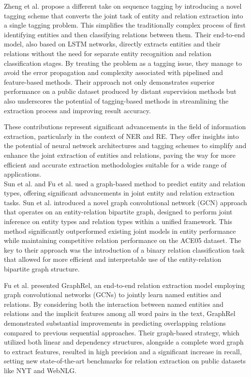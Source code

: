 Zheng et al. propose a different take on sequence tagging by introducing a novel tagging scheme that converts the joint task of entity and relation extraction into a single tagging problem. This simplifies the traditionally complex process of first identifying entities and then classifying relations between them. Their end-to-end model, also based on LSTM networks, directly extracts entities and their relations without the need for separate entity recognition and relation classification stages. By treating the problem as a tagging issue, they manage to avoid the error propagation and complexity associated with pipelined and feature-based methods. Their approach not only demonstrates superior performance on a public dataset produced by distant supervision methods but also underscores the potential of tagging-based methods in streamlining the extraction process and improving result accuracy.

These contributions represent significant advancements in the field of information extraction, particularly in the context of NER and RE. They offer insights into the potential of neural network architectures and tagging schemes to simplify and enhance the joint extraction of entities and relations, paving the way for more efficient and accurate extraction methodologies suitable for a wide range of applications.\\
Sun et al.\cite{sun-etal-2019-joint} and Fu et al.\cite{fu-etal-2019-graphrel} used a graph-based method to predict entity and relation types, offering significant advancements in joint entity and relation extraction tasks. Sun et al. introduced a novel graph convolutional network (GCN) approach that operates on an entity-relation bipartite graph, designed to perform joint inference on entity types and relation types within a unified framework. This method significantly outperformed existing joint models in entity performance while maintaining competitive relation performance on the ACE05 dataset. The key to their approach was the introduction of a binary relation classification task that allowed for more efficient and interpretable use of the entity-relation bipartite graph structure. 

Fu et al. presented GraphRel, an end-to-end relation extraction model employing graph convolutional networks (GCNs) to jointly learn named entities and relations. By considering both the interaction between named entities and relations and the implicit features among all word pairs in the text, GraphRel demonstrated substantial improvements in predicting overlapping relations compared to previous sequential approaches. Their graph-based strategy, which utilized both linear and dependency structures, alongside a complete word graph to extract features, resulted in high precision and a significant increase in recall, setting new state-of-the-art benchmarks for relation extraction on public datasets like NYT and WebNLG.

